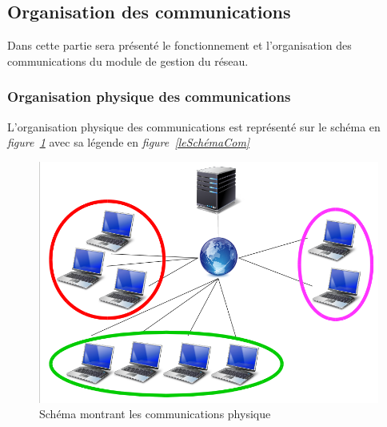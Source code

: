 \documentclass[a4paper,11pt]{report}
\begin{document}
\subsection{Organisation des communications}
Dans cette partie sera présenté le fonctionnement et l’organisation des communications du module de gestion du réseau.

\subsubsection{Organisation physique des communications}

L’organisation physique des communications est représenté sur le schéma en \textit{figure~\ref{schémaCom}} avec sa légende en \textit{figure~\ref{leSchémaCom}}
  
  \begin{figure}[th]
      \begin{center}
        \includegraphics[scale=0.3]{Assets/s_r_1.png}
        \caption{Schéma montrant les communications physique}
        \label{schémaCom}
      \end{center}
    \end{figure}
\end{document}
